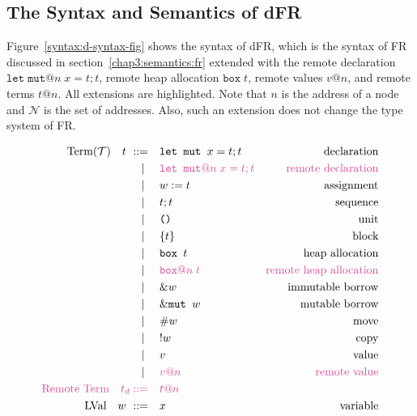 \subsection{The Syntax and Semantics of dFR} 
\label{chap3:semantics:dfr}
Figure~\ref{syntax:d-syntax-fig} shows the syntax of dFR, which is the syntax of FR discussed in section~\ref{chap3:semantics:fr} extended with the remote declaration $\texttt{let}\;\texttt{mut}@n\; x = t;t$, remote heap allocation $\texttt{box}\;t$, remote values $v@n$, and remote terms $t@n$. All extensions are highlighted. Note that $n$ is the address of a node and $\mathcal{N}$ is the set of addresses. Also, such an extension does not change the type system of FR.
\begin{figure}
\begin{alignat*}{3}
    \text{Term}(\mathcal{T}) \quad t \ \metaDeff \quad &\texttt{let mut } x = t;t &\text{declaration}\\
    \cmid \quad &\color{kirby}\texttt{let mut}@n\; x = t;t &\text{\color{kirby}remote declaration}\\
    \cmid \quad &w \metaDef t &\text{assignment}\\
    \cmid \quad &t;t &\text{sequence}\\
    \cmid \quad &\texttt{()} &\text{unit}\\
    \cmid \quad &\{t\} &\text{block}\\
    \cmid \quad &\texttt{box } t &\text{heap allocation}\\
    \cmid \quad &\color{kirby}\texttt{box}@n\; t &\text{\color{kirby}remote  heap allocation}\\
    \cmid \quad &\&w \quad &\text{immutable borrow} \\
    \cmid \quad &\&\texttt{mut } w \quad &\text{mutable borrow} \\
    \cmid \quad &\#{w} \quad &\text{move} \\
    \cmid \quad &!{w} \quad &\text{copy} \\
    \cmid \quad &v \quad &\text{value} \\
    \cmid \quad &\color{kirby}v@n \quad &\text{\color{kirby}remote value}\\
    \text{\color{kirby}Remote Term} \quad\color{kirby} t_d \metaDeff \quad &\color{kirby}t@n\\
    \text{LVal} \quad w \ \metaDeff \quad &x \quad &\text{variable} \\

\end{alignat*}
\end{figure}
